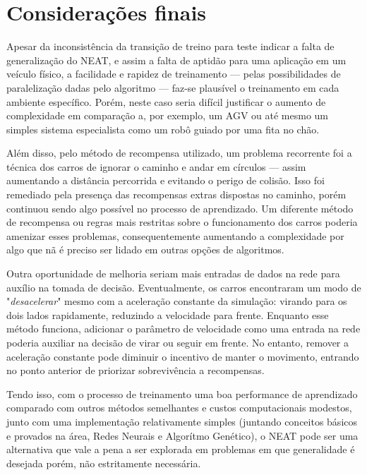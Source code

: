 \chapter{Considerações finais}

Apesar da inconsist{\^e}ncia da transi{\c
c}{\~a}o de treino para teste indicar a falta de
generaliza{\c c}{\~a}o do NEAT, e assim a falta
de aptid{\~a}o para uma aplica{\c c}{\~a}o em um
ve{\'i}culo f{\'i}sico, a facilidade e rapidez
de treinamento — pelas possibilidades de
paraleliza{\c c}{\~a}o dadas pelo algoritmo — faz-se 
plaus{\'i}vel o treinamento em cada
ambiente espec{\'i}fico. Por{\'e}m, neste caso
seria dif{\'i}cil justificar o aumento de
complexidade em compara{\c c}{\~a}o a, por
exemplo, um AGV ou at{\'e} mesmo um simples
sistema especialista como um rob{\^o} guiado
por uma fita no ch{\~a}o.

Al{\'e}m disso, pelo método de recompensa utilizado, 
um problema recorrente foi a t{\'e}cnica dos carros de 
ignorar o caminho e andar em c{\'i}rculos — assim aumentando 
a dist{\^a}ncia percorrida e evitando o perigo de colis{\~a}o. 
Isso foi remediado pela presen{\c c}a das recompensas extras 
dispostas no caminho, por{\'e}m continuou sendo algo poss{\'i}vel no 
processo de aprendizado. Um diferente m{\'e}todo de recompensa ou 
regras mais restritas sobre o funcionamento dos carros poderia 
amenizar esses problemas, consequentemente aumentando a complexidade 
por algo que n{\~a} {\'e} preciso ser lidado em outras op{\c c}{\~o}es de algoritmos.

Outra oportunidade de melhoria seriam mais entradas de dados na 
rede para aux{\'i}lio na tomada de decis{\~a}o. Eventualmente, os 
carros encontraram um modo de "\textit{desacelerar}"  mesmo com a 
acelera{\c c}{\~a}o constante da simula{\c c}{\~a}o: virando para 
os dois lados rapidamente, reduzindo a velocidade para frente. 
Enquanto esse m{\'e}todo funciona, adicionar o par{\^a}metro 
de velocidade como uma entrada na rede poderia auxiliar na decis{\~a}o 
de virar ou seguir em frente. No entanto, remover a acelera{\c c}{\~a}o 
constante pode diminuir o incentivo de manter o movimento, 
entrando no ponto anterior de priorizar sobreviv{\^e}ncia a recompensas.

Tendo isso, com o processo de treinamento uma boa
performance de aprendizado comparado com outros
m{\'e}todos semelhantes e custos computacionais 
modestos, junto com uma implementa{\c c}{\~a}o 
relativamente simples (juntando conceitos
básicos e provados na {\'a}rea, Redes Neurais e
Algor{\'i}tmo Gen{\'e}tico), o NEAT pode ser uma
alternativa que vale a pena a ser explorada em
problemas em que generalidade {\'e} desejada
por{\'e}m, n{\~a}o estritamente necess{\'a}ria.
